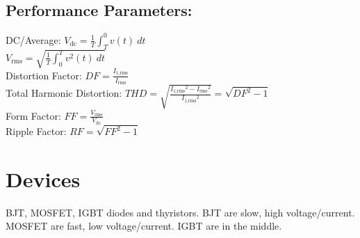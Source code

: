 \documentclass[10pt,landscape,a4paper]{article}
\newcommand{\subs}[1]{\ensuremath{_{\text{#1}}}}
\newcommand{\rms}{\subs{rms}}
\newcommand{\nrms}[1]{\subs{#1,rms}}
\begin{document}
\begin{multicols*}{4}
		\subsection{Performance Parameters:}
		DC/Average: $ V\subs{dc} = \frac{1}{T}\int_{T}^{0}v(t)~dt $ \\
		$ V\rms = \sqrt{\frac{1}{T}\int_{0}^{T}v^2(t)~dt} $\\
		Distortion Factor: $ DF = \frac{I\nrms{1}}{I\rms} $\\
		Total Harmonic Distortion: $ THD = \sqrt{\frac{I\nrms{1}^2-I\rms^2}{I\nrms{1}^2}} = \sqrt{DF^2-1} $ \\
		Form Factor: $ FF = \frac{V\rms}{V\subs{dc}} $\\
		Ripple Factor: $ RF = \sqrt{FF^2 - 1} $
		
		\section{Devices}
		BJT, MOSFET, IGBT diodes and thyristors.
		BJT are slow, high voltage/current. MOSFET are fast, low voltage/current. IGBT are in the middle. 
		

\end{multicols*}
\end{document}
